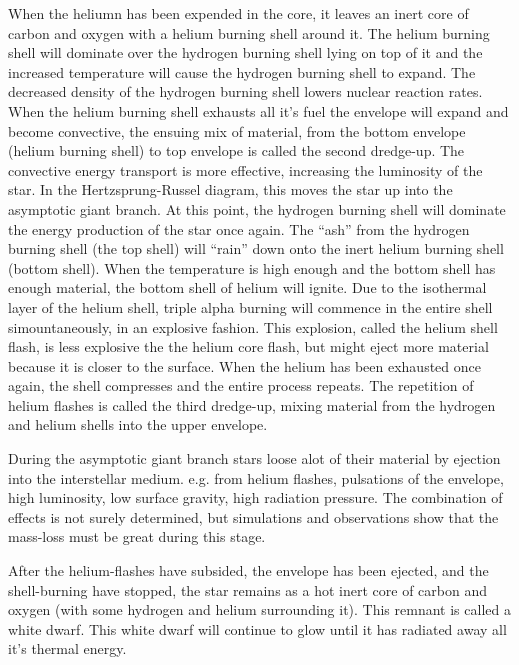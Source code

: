 When the heliumn has been expended in the core, it leaves an inert core of carbon and oxygen with a helium burning shell around it.
The helium burning shell will dominate over the hydrogen burning shell lying on top of it and the increased temperature will cause the hydrogen burning shell to expand.
The decreased density of the hydrogen burning shell lowers nuclear reaction rates.
When the helium burning shell exhausts all it's fuel the envelope will expand and become convective, the ensuing mix of material, from the bottom envelope (helium burning shell) to top envelope is called the second dredge-up.
The convective energy transport is more effective, increasing the luminosity of the star.
In the Hertzsprung-Russel diagram, this moves the star up into the asymptotic giant branch.
At this point, the hydrogen burning shell will dominate the energy production of the star once again.
The ``ash'' from the hydrogen burning shell (the top shell) will ``rain'' down onto the inert helium burning shell (bottom shell).
When the temperature is high enough and the bottom shell has enough material, the bottom shell of helium will ignite.
Due to the isothermal layer of the helium shell, triple alpha burning will commence in the entire shell simountaneously, in an explosive fashion.
This explosion, called the helium shell flash, is less explosive the the helium core flash, but might eject more material because it is closer to the surface.
When the helium has been exhausted once again, the shell compresses and the entire process repeats. The repetition of helium flashes is called the third dredge-up, mixing material from the hydrogen and helium shells into the upper envelope.

During the asymptotic giant branch stars loose alot of their material by ejection into the interstellar medium. e.g. from helium flashes, pulsations of the envelope, high luminosity, low surface gravity, high radiation pressure.
The combination of effects is not surely determined, but simulations and observations show that the mass-loss must be great during this stage.

After the helium-flashes have subsided, the envelope has been ejected, and the shell-burning have stopped, the star remains as a hot inert core of carbon and oxygen (with some hydrogen and helium surrounding it). This remnant is called a white dwarf.
This white dwarf will continue to glow until it has radiated away all it's thermal energy.
\FloatBarrier

